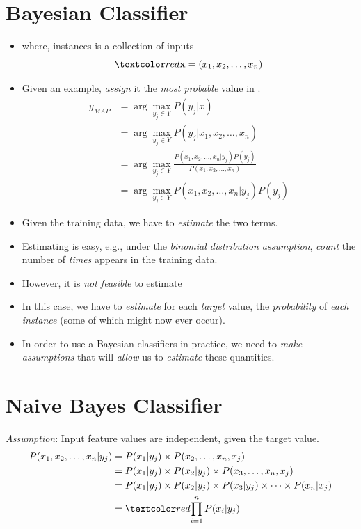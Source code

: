 \documentclass[
	number={3},
	title={Na\"iive Bayes Learning}
]{cs584notes}
\begin{document}
\section{Bayesian Classifier}\label{sec:bayesian-classifier}
\begin{itemize}
	\item {} where, instances  is a collection of inputs --
	\[ \data{ \vec{x} = (x_{1}, x_{2}, \dots, x_{n}) } \]
	\item Given an example, \emph{assign} it the \emph{most probable} value in .
	\begin{equation}[eqpurple]
	\begin{aligned}
		y_{MAP} &= \arg\max_{y_{j}\in Y} P(y_{j} | x)\\
				&= \arg\max_{y_{j}\in Y} P(y_{j} | x_{1}, x_{2}, \dots, x_{n})\\
				&= \arg\max_{y_{j}\in Y} \frac{P(x_{1}, x_{2}, \dots, x_{n}|y_{j})P(y_{j})}{P(x_{1}, x_{2}, \dots, x_{n})}\\
				&= \arg\max_{y_{j}\in Y} P(x_{1}, x_{2}, \dots, x_{n}|y_{j})P(y_{j})
	\end{aligned}
	\end{equation}
	\item Given the training data, we have to \emph{estimate} the two terms.
	\item Estimating  is easy, e.g., under the \emph{binomial distribution assumption}, \emph{count} the number of \emph{times}  appears in the training data.
	\item However, it is \emph{not feasible} to estimate 
	\item In this case, we have to \emph{estimate} for each \emph{target} value, the \emph{probability} of \emph{each instance} (some of which might now ever occur).
	\item In order to use a Bayesian classifiers in practice, we need to \emph{make assumptions} that will \emph{allow} us to \emph{estimate} these quantities.
\end{itemize}

\section{Na\:ive Bayes Classifier}\label{sec:naive-bayes-classifier}
\emph{Assumption}: Input feature values are independent, given the target value.
\begin{equation}[eqpurple]
\begin{aligned}
	P(x_{1}, x_{2}, \dots, x_{n} | y_{j}) &= P(x_{1} | y_{j}) \times P(x_{2}, \dots, x_{n}, x_{j})\\
										  &= P(x_{1} | y_{j}) \times P(x_{2} | y_{j}) \times P(x_{3}, \dots, x_{n}, x_{j})\\
										  &= P(x_{1} | y_{j}) \times P(x_{2} | y_{j}) \times P(x_{3} | y_{j}) \times \dots \times P(x_{n} | x_{j})\\
	&= \data{ \prod_{i=1}^{n} P(x_{i} | y_{j}) }
\end{aligned}
	\label{eq:naive-bayes-classifier-proof}
\end{equation}
\end{document}

